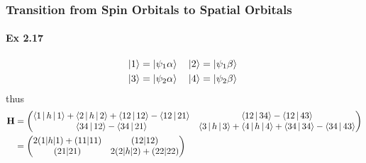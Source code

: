 \documentclass[a4paper]{article}
\newcommand{\ex}[1]{\paragraph{Ex #1}}
\numberwithin{equation}{subsection}
\begin{document}
\subsubsection{Transition from Spin Orbitals to Spatial Orbitals}
\ex{2.17}
\begin{equation}
\begin{aligned}
\ket{1} = \ket{\psi_1\alpha} & \quad \ket{2} = \ket{\psi_1\beta}\\
\ket{3} = \ket{\psi_2\alpha} & \quad \ket{4} = \ket{\psi_2\beta}\
\end{aligned}
\end{equation}
thus
\begin{equation}\label{key}
\begin{aligned}
\vb{H} &= \mqty(\Braket{1|h|1} + \Braket{2|h|2} + \Braket{12|12} - \Braket{12|21} & \Braket{12|34} - \Braket{12|43}\\
\Braket{34|12} - \Braket{34|21} & \Braket{3|h|3} + \Braket{4|h|4} + \Braket{34|34} - \Braket{34|43})\\
&= \mqty(2(1|h|1) + (11|11) & (12|12)\\
(21|21) & 2(2|h|2) + (22|22))
\end{aligned}
\end{equation}
\end{document}
